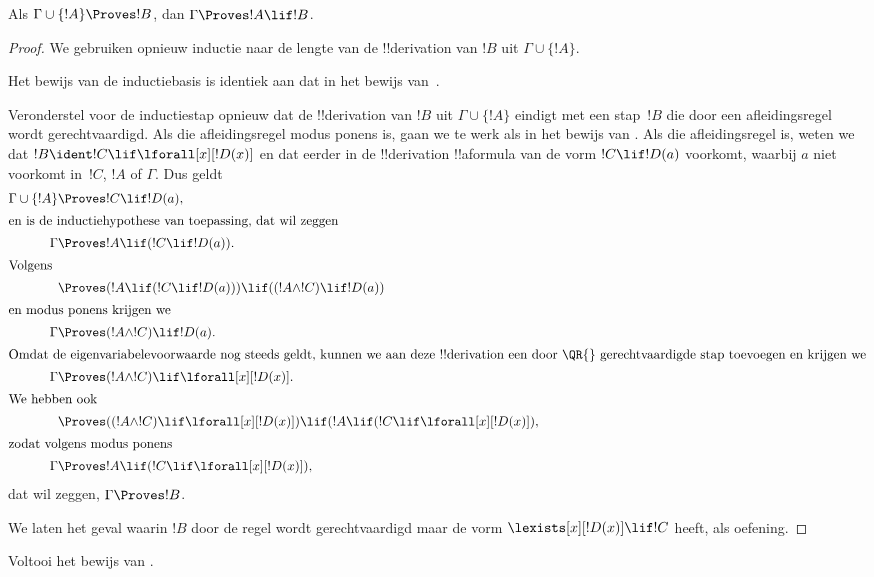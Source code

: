 \documentclass[../../../include/open-logic-section]{subfiles}
\begin{document}


\begin{thm}[Deductiestelling]
 Als $\Gamma \cup \{!A\} \Proves !B$,
dan $\Gamma \Proves !A \lif !B$.
\end{thm}

\begin{proof}
We gebruiken opnieuw inductie naar de lengte van de !!{derivation}
van $!B$ uit $\Gamma \cup \{!A\}$.

Het bewijs van de inductiebasis is identiek aan dat in het bewijs
van~.

Veronderstel voor de inductiestap opnieuw dat de !!{derivation} van
$!B$ uit $\Gamma \cup \{!A\}$ eindigt met een stap~$!B$ die door een
afleidingsregel wordt gerechtvaardigd. Als die afleidingsregel modus
ponens is, gaan we te werk als in het bewijs van
. Als die afleidingsregel \QR{} is, weten
we dat $!B \ident !C \lif \lforall[x][!D(x)]$ en dat eerder in de
!!{derivation} !!a{formula} van de vorm $!C \lif !D(a)$ voorkomt,
waarbij $a$ niet voorkomt in~$!C$, $!A$ of $\Gamma$. Dus geldt
\begin{align*}
  \Gamma \cup \{!A\} & \Proves !C \lif !D(a),\\
  \intertext{en is de inductiehypothese van toepassing, dat wil zeggen}
    \Gamma & \Proves !A \lif (!C \lif !D(a)).\\
  \intertext{Volgens}
  & \Proves (!A \lif (!C \lif !D(a))) \lif ((!A \land !C) \lif !D(a))\\
  \intertext{en modus ponens krijgen we}
  \Gamma & \Proves (!A \land !C) \lif !D(a).\\
  \intertext{Omdat de eigenvariabelevoorwaarde nog steeds geldt, kunnen we aan deze !!{derivation} een door \QR{} gerechtvaardigde stap toevoegen en krijgen we}
    \Gamma & \Proves (!A \land !C) \lif \lforall[x][!D(x)].\\
    \intertext{We hebben ook}
    & \Proves ((!A \land !C) \lif \lforall[x][!D(x)]) \lif (!A \lif (!C \lif \lforall[x][!D(x)]),\\
    \intertext{zodat volgens modus ponens}
    \Gamma & \Proves !A \lif (!C \lif \lforall[x][!D(x)]),
\end{align*}
dat wil zeggen, $\Gamma \Proves !B$.

We laten het geval waarin $!B$ door de regel \QR{} wordt
gerechtvaardigd maar de vorm $\lexists[x][!D(x)] \lif !C$ heeft, als
oefening.
\end{proof}

\begin{prob}
  Voltooi het bewijs van .
\end{prob}
\end{document}
